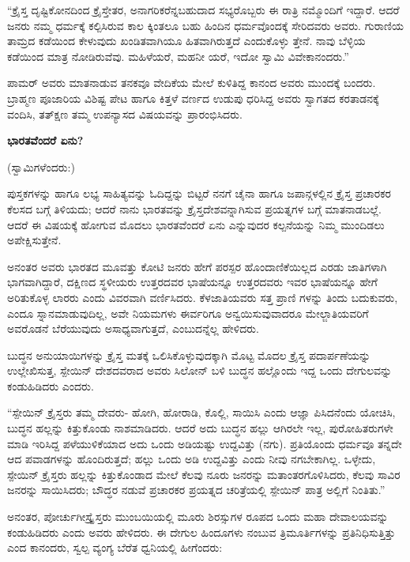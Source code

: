 “ಕ್ರೈಸ್ತ ದೃಷ್ಟಿಕೋನದಿಂದ ಕ್ರೈಸ್ತೇತರ, ಅನಾಗರಿಕರೆನ್ನಬಹುದಾದ ಸಭ್ಯರೊಬ್ಬರು ಈ ರಾತ್ರಿ ನಮ್ಮೊಂದಿಗೆ ಇದ್ದಾರೆ. ಆದರೆ ಜನರು ನಮ್ಮ ಧರ್ಮಕ್ಕೆ ಕಲ್ಪಿಸಿರುವ ಕಾಲ ಕ್ಕಿಂತಲೂ ಬಹು ಹಿಂದಿನ ಧರ್ಮವೊಂದಕ್ಕೆ ಸೇರಿದವರು ಅವರು. ಗುರಾಣಿಯ ತಾಮ್ರದ ಕಡೆಯಿಂದ ಕೇಳುವುದು ಖಂಡಿತವಾಗಿಯೂ ಹಿತವಾಗಿರುತ್ತದೆ ಎಂದುಕೊಳ್ಳು ತ್ತೇನೆ. ನಾವು ಬೆಳ್ಳಿಯ ಕಡೆಯಿಂದ ಮಾತ್ರ ನೋಡಿರುವೆವು. ಮಹಿಳೆಯರೆ, ಮಹನೀ ಯರೆ, ಇದೋ ಸ್ವಾಮಿ ವಿವೇಕಾನಂದರು.”

ಪಾಮರ್ ಅವರು ಮಾತನಾಡುವ ತನಕವೂ ವೇದಿಕೆಯ ಮೇಲೆ ಕುಳಿತಿದ್ದ ಕಾನಂದ ಅವರು ಮುಂದಕ್ಕೆ ಬಂದರು. ಬ್ರಾಹ್ಮಣ ಪೂಜಾರಿಯ ವಿಶಿಷ್ಟ ಪೇಟ ಹಾಗೂ ಕಿತ್ತಳೆ ವರ್ಣದ ಉಡುಪು ಧರಿಸಿದ್ದ ಅವರು ಸ್ವಾಗತದ ಕರತಾಡನಕ್ಕೆ ವಂದಿಸಿ, ತತ್ಕ್ಷಣ ತಮ್ಮ ಉಪನ್ಯಾಸದ ವಿಷಯವನ್ನು ಪ್ರಾರಂಭಿಸಿದರು.

\begin{center}
\textbf{ಭಾರತವೆಂದರೆ ಏನು?}
\end{center}

(ಸ್ವಾಮಿಗಳೆಂದರು:)

ಪುಸ್ತಕಗಳನ್ನು ಹಾಗೂ ಲಭ್ಯ ಸಾಹಿತ್ಯವನ್ನು ಓದಿದ್ದನ್ನು ಬಿಟ್ಟರೆ ನನಗೆ ಚೈನಾ ಹಾಗೂ ಜಪಾನ್ಗಳಲ್ಲಿನ ಕ್ರೈಸ್ತ ಪ್ರಚಾರಕರ ಕೆಲಸದ ಬಗ್ಗೆ ತಿಳಿಯದು; ಆದರೆ ನಾನು ಭಾರತವನ್ನು ಕ್ರೈಸ್ತದೇಶವನ್ನಾಗಿಸುವ ಪ್ರಯತ್ನಗಳ ಬಗ್ಗೆ ಮಾತನಾಡಬಲ್ಲೆ. ಆದರೆ ಈ ವಿಷಯಕ್ಕೆ ಹೋಗುವ ಮೊದಲು ಭಾರತವೆಂದರೆ ಏನು ಎನ್ನುವುದರ ಕಲ್ಪನೆಯನ್ನು ನಿಮ್ಮ ಮುಂದಿಡಲು ಅಪೇಕ್ಷಿಸುತ್ತೇನೆ.

ಅನಂತರ ಅವರು ಭಾರತದ ಮೂವತ್ತು ಕೋಟಿ ಜನರು ಹೇಗೆ ಪರಸ್ಪರ ಹೊಂದಾಣಿಕೆಯಿಲ್ಲದ ಎರಡು ಜಾತಿಗಳಾಗಿ ಭಾಗವಾಗಿದ್ದಾರೆ, ದಕ್ಷಿಣದ ಸ್ಥಳೀಯರು ಉತ್ತರದವರ ಭಾಷೆಯನ್ನೂ ಉತ್ತರದವರು ಇವರ ಭಾಷೆಯನ್ನೂ ಹೇಗೆ ಅರಿತುಕೊಳ್ಳ ಲಾರರು ಎಂದು ವಿವರವಾಗಿ ವರ್ಣಿಸಿದರು. ಕೆಳಜಾತಿಯವರು ಸತ್ತ ಪ್ರಾಣಿ ಗಳನ್ನು ತಿಂದು ಬದುಕುವರು, ಎಂದೂ ಸ್ನಾನಮಾಡುವುದಿಲ್ಲ, ಅವೇ ನಿಯಮಗಳು ಈರ್ವರಿಗೂ ಅನ್ವಯಿಸುವುವಾದರೂ ಮೇಲ್ಜಾತಿಯವರಿಗೆ ಅವರೊಡನೆ ಬೆರೆಯುವುದು ಅಸಾಧ್ಯವಾಗುತ್ತದೆ, ಎಂಬುದನ್ನೆಲ್ಲ ಹೇಳಿದರು.

ಬುದ್ಧನ ಅನುಯಾಯಿಗಳನ್ನು ಕ್ರೈಸ್ತ ಮತಕ್ಕೆ ಒಲಿಸಿಕೊಳ್ಳುವುದಕ್ಕಾಗಿ ಮೊಟ್ಟ ಮೊದಲ ಕ್ರೈಸ್ತ ಪದಾರ್ಪಣೆಯನ್ನು ಉಲ್ಲೇಖಿಸುತ್ತ, ಸ್ಪೇಯಿನ್ ದೇಶದವರಾದ ಅವರು ಸಿಲೋನ್ ಬಳಿ ಬುದ್ಧನ ಹಲ್ಲೊಂದು ಇದ್ದ ಒಂದು ದೇಗುಲವನ್ನು ಕಂಡುಹಿಡಿದರು ಎಂದರು.

“ಸ್ಪೇಯಿನ್ ಕ್ರೈಸ್ತರು ತಮ್ಮ ದೇವರು- ಹೋಗಿ, ಹೋರಾಡಿ, ಕೊಲ್ಲಿ, ಸಾಯಿಸಿ ಎಂದು ಆಜ್ಞಾ ಪಿಸಿದನೆಂದು ಯೋಚಿಸಿ, ಬುದ್ಧನ ಹಲ್ಲನ್ನು ಕಿತ್ತುಕೊಂಡು ನಾಶಮಾಡಿದರು. ಆದರೆ ಅದು ಬುದ್ಧನ ಹಲ್ಲು ಆಗಿರಲೇ ಇಲ್ಲ, ಪುರೋಹಿತರುಗಳೇ ಮಾಡಿ ಇರಿಸಿದ್ದ ಪಳೆಯುಳಿಕೆಯಾದ ಅದು ಒಂದು ಅಡಿಯಷ್ಟು ಉದ್ದವಿತ್ತು (ನಗು). ಪ್ರತಿಯೊಂದು ಧರ್ಮವೂ ತನ್ನದೇ ಆದ ಪವಾಡಗಳನ್ನು ಹೊಂದಿರುತ್ತದೆ; ಹಲ್ಲು ಒಂದು ಅಡಿ ಉದ್ದವಿತ್ತು ಎಂದು ನೀವು ನಗಬೇಕಾಗಿಲ್ಲ. ಒಳ್ಳೇದು, ಸ್ಪೇಯಿನ್ ಕ್ರೈಸ್ತರು ಹಲ್ಲನ್ನು ಕಿತ್ತುಕೊಂಡಾದ ಮೇಲೆ ಕೆಲವು ನೂರು ಜನರನ್ನು ಮತಾಂತರಗೊಳಿಸಿದರು, ಕೆಲವು ಸಾವಿರ ಜನರನ್ನು ಸಾಯಿಸಿದರು; ಬೌದ್ಧರ ನಡುವೆ ಪ್ರಚಾರಕರ ಪ್ರಯತ್ನದ ಚರಿತ್ರೆಯಲ್ಲಿ ಸ್ಪೇಯಿನ್ ಪಾತ್ರ ಅಲ್ಲಿಗೆ ನಿಂತಿತು.”

ಅನಂತರ, ಪೋರ್ಚುಗೀಸ್ಕ್ರೈಸ್ತರು ಮುಂಬಯಿಯಲ್ಲಿ ಮೂರು ಶಿರಸ್ಸುಗಳ ರೂಪದ ಒಂದು ಮಹಾ ದೇವಾಲಯವನ್ನು ಕಂಡುಹಿಡಿದರು ಎಂದು ಅವರು ಹೇಳಿದರು. ಈ ದೇಗುಲ ಹಿಂದೂಗಳು ನಂಬುವ ತ್ರಿಮೂರ್ತಿಗಳನ್ನು ಪ್ರತಿನಿಧಿಸುತ್ತಿತ್ತು ಎಂದ ಕಾನಂದರು, ಸ್ವಲ್ಪ ವ್ಯಂಗ್ಯ ಬೆರೆತ ಧ್ವನಿಯಲ್ಲಿ ಹೀಗೆಂದರು:


